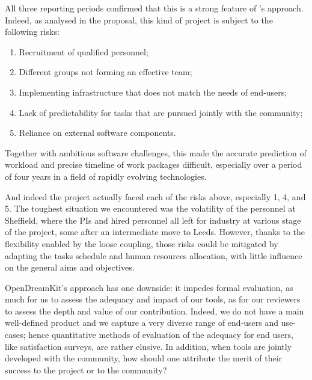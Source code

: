 All three reporting periods confirmed that this is a strong
feature of \ODK's approach. Indeed, as analysed in the proposal, this
kind of project is subject to the following risks:
\begin{enumerate}
\item Recruitment of qualified personnel;
\item Different groups not forming an effective team;
\item Implementing infrastructure that does not match the needs of end-users;
\item Lack of predictability for tasks that are pursued jointly with
  the community;
\item Reliance on external software components.
\end{enumerate}
Together with ambitious software challenges, this made the accurate
prediction of workload and precise timeline of work packages
difficult, especially over a period of four years in a field of
rapidly evolving technologies.

And indeed the project actually faced each of the risks above,
especially 1, 4, and 5.
The toughest situation we encountered was the volatility of the personnel at
Sheffield, where the PIs and hired personnel all left for industry at
various stage of the project, some after an intermediate move to
Leeds. However, thanks to the flexibility enabled by
the loose coupling, those risks could be mitigated by adapting the
tasks schedule and human resources allocation, with little influence
on the general aims and objectives.


OpenDreamKit's approach has one downside: it impedes formal
evaluation, as much for us to assess the adequacy and impact of our
tools, as for our reviewers to assess the depth and value of our
contribution. Indeed, we do not have a main well-defined product and
we capture a very diverse range of end-users and use-cases; hence
quantitative methods of evaluation of the adequacy for end users, like
satisfaction surveys, are rather elusive. In addition, when tools are
jointly developed with the community, how should one attribute the
merit of their success to the project or to the community?


